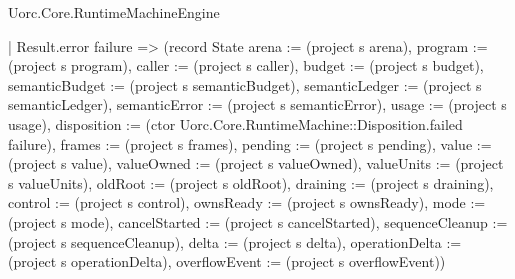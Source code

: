 \begin{lexlean}{Uorc.Core.RuntimeMachineEngine}
\begin{semanticmodule}
{      | Result.error failure => (record State {arena := (project s arena), program := (project s program), caller := (project s caller), budget := (project s budget), semanticBudget := (project s semanticBudget), semanticLedger := (project s semanticLedger), semanticError := (project s semanticError), usage := (project s usage), disposition := (ctor Uorc.Core.RuntimeMachine::Disposition.failed failure), frames := (project s frames), pending := (project s pending), value := (project s value), valueOwned := (project s valueOwned), valueUnits := (project s valueUnits), oldRoot := (project s oldRoot), draining := (project s draining), control := (project s control), ownsReady := (project s ownsReady), mode := (project s mode), cancelStarted := (project s cancelStarted), sequenceCleanup := (project s sequenceCleanup), delta := (project s delta), operationDelta := (project s operationDelta), overflowEvent := (project s overflowEvent)})
}
\end{semanticmodule}
\end{lexlean}
